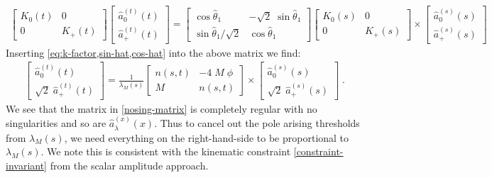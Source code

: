 \documentclass[10pt, aps,prd,amsmath,amssymb,superscriptaddress,onecolumn,
nofootinbib,showpacs,preprintnumbers]{revtex4-1}
\begin{document}
  \begin{align} \label{matrix-helicity}
    \begin{bmatrix}
        K_{0}(t)   & 0 \\
        0  &  K_{+}(t)
    \end{bmatrix}
    \begin{bmatrix}
      \hat{a}^{(t)}_{0}(t) \\
      \hat{a}^{(t)}_{+}(t)
    \end{bmatrix}
    =
    \begin{bmatrix}
      \cos \hat{\theta}_1   &  - \sqrt{2} \; \sin \hat{\theta}_1   \\
       \sin \hat{\theta}_1 / \sqrt{2}  &  \cos \hat{\theta}_1
    \end{bmatrix}
    \begin{bmatrix}
        K_{0}(s)   & 0 \\
        0  &  K_{+}(s)
    \end{bmatrix}
    \times
    \begin{bmatrix}
  \hat{a}^{(s)}_{0}(s) \\
  \hat{a}^{(s)}_{+}(s)
    \end{bmatrix}
  \end{align}
Inserting \cref{eq:k-factor,sin-hat,cos-hat} into the above matrix we find:
  \begin{align} \label{nosing-matrix}
    \begin{bmatrix}
  \hat{a}^{(t)}_{0}(t) \\
  \sqrt{2} \; \hat{a}^{(t)}_{+}(t)
    \end{bmatrix}
    =
    \frac{1}{\lambda_M(s)}
    \begin{bmatrix}
        n(s,t)   & - 4 \; M \; \phi \\
        M  & n(s,t)
    \end{bmatrix}
    \times
    \begin{bmatrix}
  \hat{a}^{(s)}_{0}(s) \\
  \sqrt{2} \;  \hat{a}^{(s)}_{+}(s)
    \end{bmatrix} \; .
  \end{align}
We see that the matrix in \ref{nosing-matrix} is completely regular with no singularities and so are \(\hat{a}_\lambda^{(x)}(x)\). Thus to cancel out the pole arising thresholds from \(\lambda_M(s)\), we need everything on the right-hand-side to be proportional to \(\lambda_M(s)\). We note this is consistent with the kinematic constraint \cref{constraint-invariant} from the scalar amplitude approach.
\end{document}
